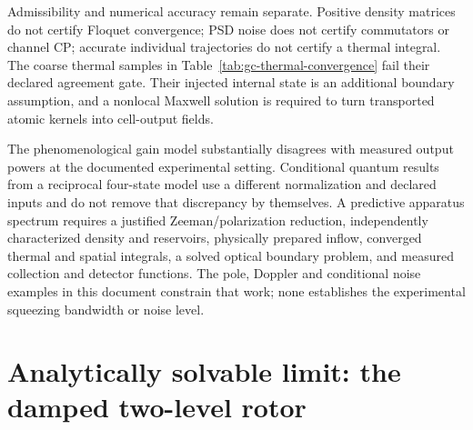 \documentclass[11pt,a4paper]{article}
\begin{document}
Admissibility and numerical accuracy remain separate. Positive density
matrices do not certify Floquet convergence; PSD noise does not certify
commutators or channel CP; accurate individual trajectories do not certify a
thermal integral. The coarse thermal samples in
Table~\ref{tab:gc-thermal-convergence} fail their declared agreement gate.
Their injected internal state is an additional boundary assumption, and a
nonlocal Maxwell solution is required to turn transported atomic kernels into
cell-output fields.

The phenomenological gain model substantially disagrees with measured output
powers at the documented experimental setting. Conditional quantum results
from a reciprocal four-state model use a different normalization and declared
inputs and do not remove that discrepancy by themselves. A predictive
apparatus spectrum requires a justified Zeeman/polarization reduction,
independently characterized density and reservoirs, physically prepared inflow,
converged thermal and spatial integrals, a solved optical boundary problem,
and measured collection and detector functions. The pole, Doppler and
conditional noise examples in this document constrain that work; none
establishes the experimental squeezing bandwidth or noise level.

\appendix

\section{Analytically solvable limit: the damped two-level rotor}
\label{sec:torrey}
\end{document}
